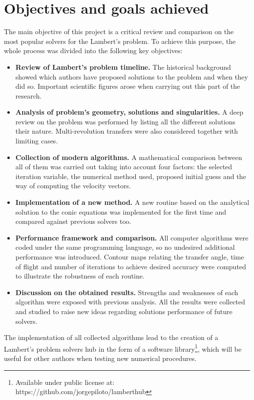 \section{Objectives and goals achieved}

The main objective of this project is a critical review and comparison on the
most popular solvers for the Lambert's problem. To achieve this purpose, the
whole process was divided into the following key objectives:

\begin{itemize}

  \item \textbf{Review of Lambert's problem timeline.}
        The historical background showed which authors have proposed solutions
        to the problem and when they did so. Important scientific
        figures arose when carrying out this part of the research.

  \item \textbf{Analysis of problem's geometry, solutions and singularities.}
        A deep review on the problem was performed by listing all the
        different solutions their nature.  Multi-revolution transfers were also
        considered together with limiting cases.

  \item \textbf{Collection of modern algorithms.}
        A mathematical comparison between all of them was carried out taking
        into account four factors: the selected iteration variable, the
        numerical method used, proposed initial guess and the way of
        computing the velocity vectors.

  \item \textbf{Implementation of a new method.}
        A new routine based on the analytical solution to the conic equations
        was implemented for the first time and compared against previous
        solvers too.

  \item \textbf{Performance framework and comparison.}
        All computer algorithms were coded under the same programming language,
        so no undesired additional performance was introduced.  Contour
        maps relating the transfer angle, time of flight and number of
        iterations to achieve desired accuracy were computed to
        illustrate the robustness of each routine.

  \item \textbf{Discussion on the obtained results.}
        Strengths and weaknesses of each algorithm were exposed with previous
        analysis. All the results were collected and studied to raise
        new ideas regarding solutions performance of future solvers.

\end{itemize}

The implementation of all collected algorithms lead to the creation of a
Lambert's problem solvers hub in the form of a software
library\footnote{Available under public license at:
  https://github.com/jorgepiloto/lamberthub}, which will be useful for other
authors when testing new numerical procedures.
